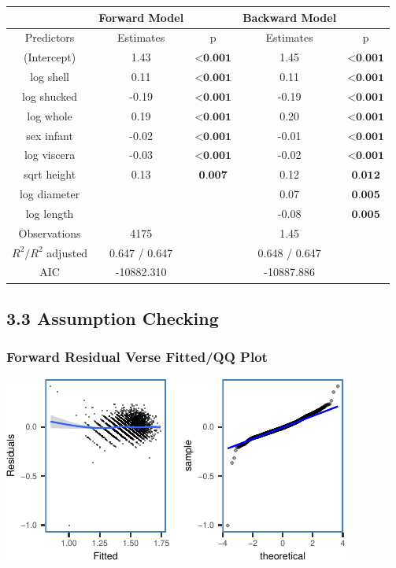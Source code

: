 \documentclass[letterpaper,9pt,twocolumn,twoside,]{pinp}
\begin{document}
\begin{center}
\begin{tabular}{c c c c c}
    & Forward Model & & Backward Model & \\
    \hline
    Predictors & Estimates & p & Estimates & p\\
    \hline
    (Intercept) & 1.43 & $\textbf{<0.001}$ & 1.45 & $\textbf{<0.001}$\\
    log shell & 0.11 & $\textbf{<0.001}$ & 0.11 & $\textbf{<0.001}$\\
    log shucked & -0.19 & $\textbf{<0.001}$ & -0.19 & $\textbf{<0.001}$\\
    log whole & 0.19 & $\textbf{<0.001}$ & 0.20 & $\textbf{<0.001}$\\
    sex infant & -0.02 & $\textbf{<0.001}$ & -0.01 & $\textbf{<0.001}$\\
    log viscera & -0.03 & $\textbf{<0.001}$ & -0.02 & $\textbf{<0.001}$\\
    sqrt height & 0.13 & $\textbf{0.007}$ & 0.12 & $\textbf{0.012}$\\
    log diameter &  & & 0.07 & $\textbf{0.005}$\\
    log length &  & & -0.08 & $\textbf{0.005}$\\
    \hline
    Observations & 4175 &  & 1.45 & \\
    $R^2/R^2$ adjusted & 0.647 / 0.647 & & 0.648 / 0.647 & \\
    AIC & -10882.310 & & -10887.886 & \\
\end{tabular}
\end{center}

\newpage

\hypertarget{assumption-checking}{%
\subsection{3.3 Assumption Checking}\label{assumption-checking}}

\hypertarget{forward-residual-verse-fittedqq-plot}{%
\subsubsection{Forward Residual Verse Fitted/QQ
Plot}\label{forward-residual-verse-fittedqq-plot}}

\begin{center}\includegraphics{ExecSum_files/figure-latex/unnamed-chunk-4-1} \end{center}
\end{document}
